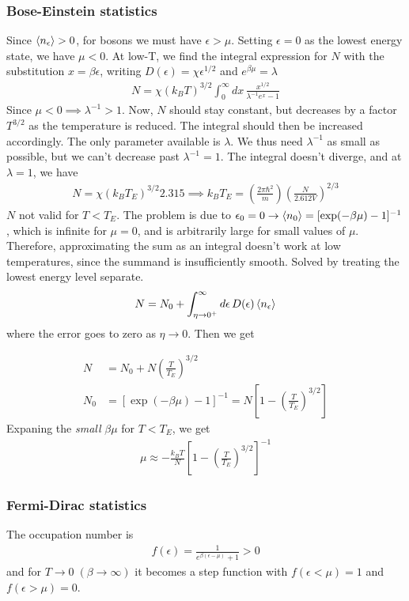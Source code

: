 \documentclass[a4paper, english, 12pt]{article}
\newcommand{\eps}{\epsilon}
\newcommand{\closed}[1]{\left( #1 \right)}
\newcommand{\bracket}[1]{\left[ #1 \right]}
\begin{document}
\begin{multicols*}{2}
\subsubsection*{Bose-Einstein statistics}
Since $\expval{n_\eps}>0$, for bosons we must have $\eps>\mu$. Setting $\eps=0$ as the lowest energy state, we have $\mu<0$. At low-T, we find the integral expression for $N$ with the substitution $x=\beta\eps$, writing $D(\eps)=\chi \eps^{1/2}$ and $e^{\beta\mu}=\lambda$ 
\begin{align*}
    N = \chi (k_B T)^{3/2} \int_0^\infty dx\, \frac{x^{1/2}}{\lambda^{-1} e^x - 1}
\end{align*}
Since $\mu<0\implies\lambda^{-1}>1$. Now, $N$ should stay constant, but decreases by a factor $T^{3/2}$ as the temperature is reduced. The integral should then be increased accordingly. The only parameter available is $\lambda$. We thus need $\lambda^{-1}$ as small as possible, but we can't decrease past $\lambda^{-1}=1$. The integral doesn't diverge, and at $\lambda=1$, we have 
\begin{align*}
    N = \chi (k_B T_E)^{3/2} 2.315 \implies k_B T_E = \left( \frac{2\pi\hbar^2}{m}\right) \left( \frac{N}{2.612V} \right)^{2/3}
\end{align*} 
$N$ not valid for $T<T_E$. The problem is due to $\eps_0=0\to\expval{n_0}=[\exp(-\beta\mu)-1]^{-1}$, which is infinite for $\mu=0$, and is arbitrarily large for small values of $\mu$. Therefore, approximating the sum as an integral doesn't work at low temperatures, since the summand is insufficiently smooth. Solved by treating the lowest energy level separate. 
\begin{align*}
    N = N_0 + \int_{\eta\to0^+}^\infty d\eps\,D(\eps) \expval{n_\eps}
\end{align*}
where the error goes to zero as $\eta\to0$. Then we get 

\begin{align*}
    N &= N_0 + N \left(\frac{T}{T_E}\right)^{3/2} \\ 
    N_0 &= [\exp(-\beta\mu)-1]^{-1} = N\bracket{1-\closed{\frac{T}{T_E}}^{3/2} }
\end{align*}
Expaning the \textit{small} $\beta \mu$ for $T<T_E$, we get 
\begin{align*}
    \mu \approx -\frac{k_B T}{N}\bracket{1-\closed{\frac{T}{T_E}}^{3/2}}^{-1}
\end{align*}


\subsubsection*{Fermi-Dirac statistics}
The occupation number is 
\begin{align*}
    f(\eps)=\frac{1}{e^{\beta(\eps-\mu)} +1} > 0
\end{align*}
and for $T\to0\; (\beta\to\infty)$ it becomes a step function with $f(\eps<\mu)=1$ and $f(\eps>\mu)=0$. 


\end{multicols*}
\end{document}
